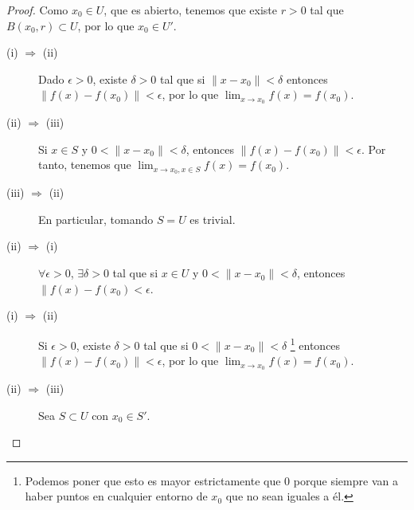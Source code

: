 \begin{proof}
Como $\displaystyle x_{0} \in U $, que es abierto, tenemos que existe $\displaystyle r > 0 $ tal que $\displaystyle B\left(x_{0},r \right) \subset U $, por lo que $\displaystyle x_{0} \in U' $.
\begin{description}
\item[(i) $\displaystyle \Rightarrow $ (ii)] Dado $\displaystyle \epsilon > 0 $, existe $\displaystyle \delta > 0 $ tal que si $\displaystyle \|x-x_{0}\| < \delta  $ entonces $\displaystyle \|f\left(x\right)-f\left(x_{0}\right)\| < \epsilon  $, por lo que $\displaystyle \lim_{x \to x_{0}}f\left(x\right) = f\left(x_{0}\right) $.
\item[(ii) $\displaystyle  \Rightarrow $ (iii)] Si $\displaystyle x \in S $ y $\displaystyle 0 < \|x-x_{0}\|<\delta  $, entonces $\displaystyle \|f\left(x\right)-f\left(x_{0}\right)\|<\epsilon  $. Por tanto, tenemos que $\displaystyle \lim_{x \to x_{0}, x\in S}f\left(x\right) = f\left(x_{0}\right) $. 
\item[(iii) $\displaystyle \Rightarrow $ (ii)] En particular, tomando $\displaystyle S = U $ es trivial. 
\item[(ii) $\displaystyle \Rightarrow $ (i)] $\displaystyle \forall \epsilon > 0 $, $\displaystyle \exists \delta > 0 $ tal que si $\displaystyle x \in U $ y $\displaystyle 0 < \|x - x_{0}\| < \delta  $, entonces $\displaystyle \|f\left(x\right)-f\left(x_{0}\right)<\epsilon  $. 
\end{description}
\begin{description}
\item[(i) $\displaystyle \Rightarrow $ (ii)] Si $\displaystyle \epsilon > 0 $, existe $\displaystyle \delta > 0 $ tal que si $\displaystyle 0<\|x - x_{0}\| < \delta  $ \footnote{Podemos poner que esto es mayor estrictamente que 0 porque siempre van a haber puntos en cualquier entorno de $\displaystyle x_{0} $ que no sean iguales a él.} entonces $\displaystyle \|f\left(x\right)-f\left(x_{0}\right)\| < \epsilon  $, por lo que $\displaystyle \lim_{x \to x_{0}}f\left(x\right) = f\left(x_{0}\right) $. 
\item[(ii) $\displaystyle \Rightarrow $ (iii)] Sea $\displaystyle S \subset U $ con $\displaystyle x_{0} \in S' $. 
\end{description}

\end{proof}
